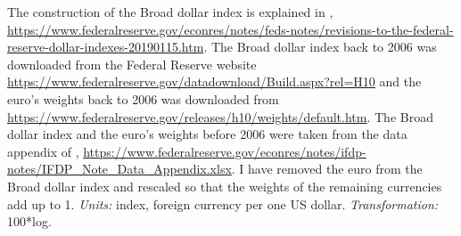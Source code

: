 \documentclass[a4paper,12pt]{article}
\begin{document}
\begin{itemize}
The construction of the Broad dollar index is explained in \cite{Beschwitz_etal_2019},
\url{https://www.federalreserve.gov/econres/notes/feds-notes/revisions-to-the-federal-reserve-dollar-indexes-20190115.htm}. The Broad dollar index back to 2006 was downloaded from the Federal Reserve website \url{https://www.federalreserve.gov/datadownload/Build.aspx?rel=H10}
and the euro's weights back to 2006 was downloaded from \url{https://www.federalreserve.gov/releases/h10/weights/default.htm}. The Broad dollar index and the euro's weights before 2006 were taken from the data appendix of \cite{Beschwitz_etal_2019}, \url{https://www.federalreserve.gov/econres/notes/ifdp-notes/IFDP_Note_Data_Appendix.xlsx}. I have removed the euro from the Broad dollar index and rescaled so that the weights of the remaining currencies add up to 1. 
\emph{Units:} index, foreign currency per one US dollar. \emph{Transformation:} 100*log.


\end{itemize}
\end{document}
